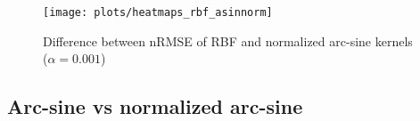 \begin{figure}[H]
    \texttt{[image: plots/heatmaps\_rbf\_asinnorm]}
    \caption{Difference between nRMSE of RBF and normalized arc-sine kernels ($\alpha=0.001$)}
    \label{fig:paired-ttest-rbf-asinnorm-diff}
\end{figure}

%
%
%
%
%
%

\subsection{Arc-sine vs normalized arc-sine}

